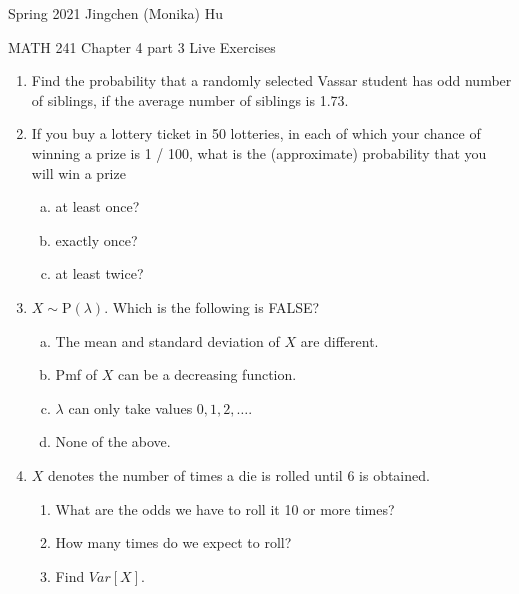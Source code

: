 \documentclass[11pt]{article}
\begin{document}
\enlargethispage{\baselineskip}

Spring 2021 \hfill Jingchen (Monika) Hu\\

\begin{center}
{\huge MATH 241 Chapter 4 part 3 Live Exercises}	\\
\end{center}
\vspace{0.5cm}

\begin{enumerate}


\item Find the probability that a randomly selected Vassar student has odd number of siblings, if the average number of siblings is 1.73.

\item If you buy a lottery ticket in 50 lotteries, in each of which your chance of winning a prize is 1 / 100, what is the (approximate) probability that you will win a prize 

\begin{enumerate}[(a)]
\item at least once?
\item exactly once? 
\item at least twice?
\end{enumerate}

\item $X \sim \text{P}(\lambda)$. Which is the following is FALSE?

\begin{enumerate}[(a)]
\item The mean and standard deviation of $X$ are different.
\item Pmf of $X$ can be a decreasing function.
\item $\lambda$ can only take values $0, 1, 2, \ldots$.
\item None of the above.
\end{enumerate}

\item $X$ denotes the number of times a die is rolled until 6 is obtained.
\begin{enumerate}
\item What are the odds we have to roll it 10 or more times?
\item How many times do we expect to roll?
\item Find $Var[X]$.
\end{enumerate}


\end{enumerate}
\end{document}
